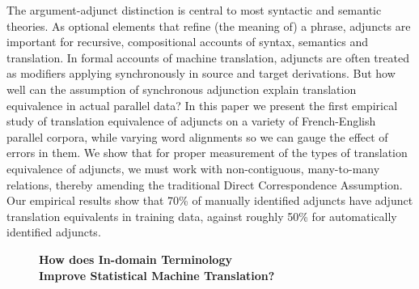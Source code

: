 \documentclass[10pt, a4paper, twopage, headinclude, footinclude, BCOR5mm]{book}
\begin{document}
\begin{table}[t!]
\end{table} 
\noindent
The argument-adjunct distinction is central to most syntactic and semantic theories. As optional elements that refine (the meaning of) a phrase, adjuncts are important for recursive, compositional accounts of syntax, semantics and translation. In formal accounts of machine translation, adjuncts are often treated as modifiers applying synchronously in source and target derivations. But how well can the assumption of synchronous adjunction explain translation equivalence in actual parallel data? In this paper we present the first empirical study of translation equivalence of adjuncts on a variety of French-English parallel corpora, while varying word alignments so we can gauge the effect of errors in them. We show that for proper measurement of the types of translation equivalence of adjuncts, we must work with non-contiguous, many-to-many relations, thereby amending the traditional Direct Correspondence Assumption. Our empirical results show that 70\% of manually identified adjuncts have adjunct translation equivalents in training data, against roughly 50\% for automatically identified adjuncts.  

\newpage

\begin{figure}[t!]
\centering
\large\textbf{How does In-domain Terminology \\ Improve Statistical Machine Translation?}
\vspace*{0.5cm}
\end{figure}
\end{document}
